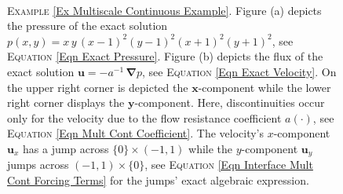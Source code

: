 \documentclass[3p]{elsarticle}
\def\u{\mathbf u}
\def\grad{\bm{\nabla}}
\begin{document}
\begin{example}
\begin{figure}[t]
	~ %
	\begin{subfigure}[Flux Exact Solution.]
		{\resizebox{7.8cm}{8.0cm}
			{\texttt{[image: Multiscale\_Exact\_Velocity.pdf]} } 
			}                
	\end{subfigure} %
	\caption{\textsc{Example} \ref{Ex Multiscale Continuous Example}. Figure (a) depicts the pressure of the exact solution $ p(x, y) =  x \, y \, (x -1)^{2} (y - 1)^{2}(x + 1)^{2}(y + 1)^{2} $, see \textsc{Equation} \eqref{Eqn Exact Pressure}.
	Figure (b) depicts the flux of the exact solution 
	$ \u = -a^{-1}\,\grad p 
	$, see \textsc{Equation} \eqref{Eqn Exact Velocity}. On the upper right corner is depicted the $\boldsymbol{x}$-component while the lower right corner displays the $\boldsymbol{y}$-component. Here, discontinuities occur only for the velocity due to the flow resistance coefficient $a(\cdot) $, see \textsc{Equation} \eqref{Eqn Mult Cont Coefficient}. The velocity's $ x $-component $ \u_{x} $ has a jump across $ \{0\} \times(-1, 1) $ while the $ y $-component $ \u_{y} $ jumps across $ (-1, 1) \times \{0\} $, see \textsc{Equation} \eqref{Eqn Interface Mult Cont Forcing Terms} for the jumps' exact algebraic expression. \label{Fig Multiscale Exact Solution Numerical Example} }
\end{figure}
%
%
%
%
\begin{figure}[h] %
	\centering
	\begin{subfigure}
	[Pressure Approximate Solution. ]
		{\resizebox{7.8cm}{8.0cm}
}
\end{subfigure}
\end{figure}
\end{example}
\end{document}
